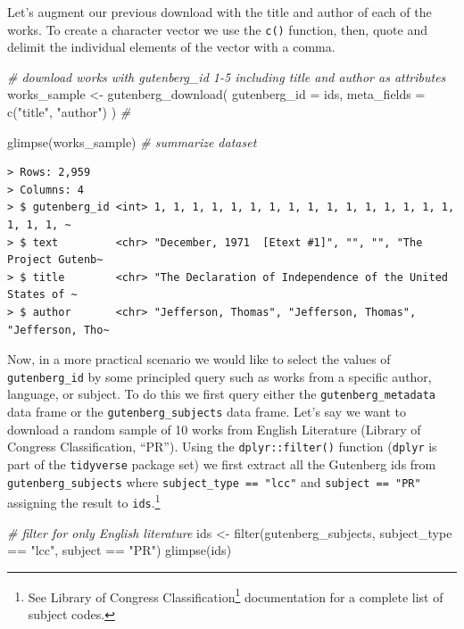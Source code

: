 \documentclass[
  letterpaper,
]{latex/krantz}
\newenvironment{Shaded}{\begin{snugshade}}{\end{snugshade}}
\newcommand{\AttributeTok}[1]{\textcolor[rgb]{0.00,0.00,0.00}{#1}}
\newcommand{\CommentTok}[1]{\textcolor[rgb]{0.00,0.00,0.00}{\textit{#1}}}
\newcommand{\FunctionTok}[1]{\textcolor[rgb]{0.00,0.00,0.00}{#1}}
\newcommand{\NormalTok}[1]{\textcolor[rgb]{0.00,0.00,0.00}{#1}}
\newcommand{\OtherTok}[1]{\textcolor[rgb]{0.00,0.00,0.00}{#1}}
\newcommand{\SpecialCharTok}[1]{\textcolor[rgb]{0.00,0.00,0.00}{#1}}
\newcommand{\StringTok}[1]{\textcolor[rgb]{0.00,0.00,0.00}{#1}}
\DeclareRobustCommand{\href}[2]{#2\footnote{\url{#1}}}
\begin{document}
Let's augment our previous download with the title and author of each of
the works. To create a character vector we use the \texttt{c()}
function, then, quote and delimit the individual elements of the vector
with a comma.

\begin{Shaded}
\begin{Highlighting}[]
\CommentTok{\# download works with \textasciigrave{}gutenberg\_id\textasciigrave{} 1{-}5 including \textasciigrave{}title\textasciigrave{} and \textasciigrave{}author\textasciigrave{} as attributes}
\NormalTok{works\_sample }\OtherTok{\textless{}{-}}
  \FunctionTok{gutenberg\_download}\NormalTok{(}
    \AttributeTok{gutenberg\_id =}\NormalTok{ ids,}
    \AttributeTok{meta\_fields =} \FunctionTok{c}\NormalTok{(}\StringTok{"title"}\NormalTok{, }\StringTok{"author"}\NormalTok{)}
\NormalTok{  ) }\CommentTok{\#}

\FunctionTok{glimpse}\NormalTok{(works\_sample) }\CommentTok{\# summarize dataset}
\end{Highlighting}
\end{Shaded}

\begin{verbatim}
> Rows: 2,959
> Columns: 4
> $ gutenberg_id <int> 1, 1, 1, 1, 1, 1, 1, 1, 1, 1, 1, 1, 1, 1, 1, 1, 1, 1, 1, ~
> $ text         <chr> "December, 1971  [Etext #1]", "", "", "The Project Gutenb~
> $ title        <chr> "The Declaration of Independence of the United States of ~
> $ author       <chr> "Jefferson, Thomas", "Jefferson, Thomas", "Jefferson, Tho~
\end{verbatim}

Now, in a more practical scenario we would like to select the values of
\texttt{gutenberg\_id} by some principled query such as works from a
specific author, language, or subject. To do this we first query either
the \texttt{gutenberg\_metadata} data frame or the
\texttt{gutenberg\_subjects} data frame. Let's say we want to download a
random sample of 10 works from English Literature (Library of Congress
Classification, ``PR''). Using the \texttt{dplyr::filter()} function
(\texttt{dplyr} is part of the \texttt{tidyverse} package set) we first
extract all the Gutenberg ids from \texttt{gutenberg\_subjects} where
\texttt{subject\_type\ ==\ "lcc"} and \texttt{subject\ ==\ "PR"}
assigning the result to \texttt{ids}.\footnote{See
  \href{https://www.loc.gov/catdir/cpso/lcco/}{Library of Congress
  Classification} documentation for a complete list of subject codes.}

\begin{Shaded}
\begin{Highlighting}[]
\CommentTok{\# filter for only English literature}
\NormalTok{ids }\OtherTok{\textless{}{-}} 
  \FunctionTok{filter}\NormalTok{(gutenberg\_subjects, subject\_type }\SpecialCharTok{==} \StringTok{"lcc"}\NormalTok{, subject }\SpecialCharTok{==} \StringTok{"PR"}\NormalTok{)}
\FunctionTok{glimpse}\NormalTok{(ids)}
\end{Highlighting}
\end{Shaded}
\end{document}

